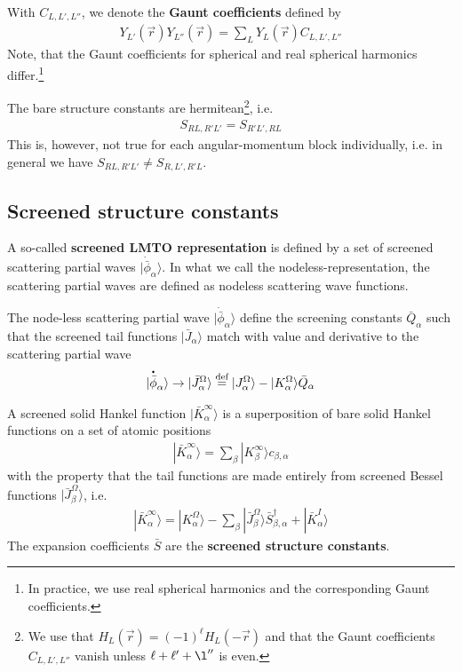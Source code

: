 \documentclass[11pt,a4paper]{report}
\begin{document}
With $C_{L,L',L''}$, we denote the \textbf{Gaunt
  coefficients} defined by
\begin{eqnarray}
Y_{L'}(\vec{r})Y_{L''}(\vec{r})=\sum_L Y_{L}(\vec{r})C_{L,L',L''}
\end{eqnarray}
Note, that the Gaunt coefficients for spherical and real spherical
harmonics differ.\footnote{In practice, we use real spherical
  harmonics and the corresponding Gaunt coefficients.}

The bare structure constants are hermitean\footnote{We use that
  $H_L(\vec{r})=(-1)^\ell H_L(-\vec{r})$ and that the Gaunt
  coefficients $C_{L,L',L''}$ vanish unless $\ell+\ell'+\l''$ is
  even.}, i.e.
\begin{eqnarray}
S_{RL,R'L'}=S_{R'L',RL}
\end{eqnarray}
This is, however, not true for each angular-momentum block individually,
i.e. in general we have $S_{RL,R'L'}\neq S_{R,L',R'L}$.

\subsection{Screened structure constants}
A so-called \textbf{screened LMTO representation} is defined by a set of screened scattering partial waves
$|\dot{\bar{\phi}}_\alpha\rangle$.  In what we call the
nodeless-representation, the scattering partial waves are defined as
nodeless scattering wave functions.

The node-less scattering partial wave
$|\dot{\bar{\phi}}_\alpha\rangle$ define the screening constants
$\bar{Q}_{\alpha}$ such that the screened tail functions
$|\bar{J}_\alpha\rangle$ match with value and derivative to the
scattering partial wave
\begin{eqnarray}
|\overset{\mbox{\large\bfseries .}}{\bar{\phi}}_\alpha\rangle \rightarrow 
|\bar{J}^{\Omega}_{\alpha}\rangle
\stackrel{\text{def}}{=}
|J^{\Omega}_{\alpha}\rangle
-|K^{\Omega}_{\alpha}\rangle \bar{Q}_{\alpha}
\end{eqnarray}

A screened solid Hankel function $|\bar{K}_{\alpha}^\infty\rangle$ is
a superposition of bare solid Hankel functions on a set of atomic
positions
\begin{eqnarray}
|\bar{K}^\infty_\alpha\rangle=\sum_\beta|K^\infty_\beta\rangle c_{\beta,\alpha}
\label{eq:kbarassuperposofkbare}
\end{eqnarray}
with the property that the tail functions are made entirely
from screened Bessel functions $|\bar{J}^\Omega_{\beta}\rangle$, i.e.
\begin{eqnarray}
|\bar{K}_{\alpha}^\infty\rangle=|K^\Omega_{\alpha}\rangle
-\sum_{\beta}|\bar{J}^\Omega_{\beta}\rangle \bar{S}^\dagger_{\beta,\alpha}
+|\bar{K}^I_{\alpha}\rangle
\label{eq:kbarwithsbar}
\end{eqnarray}
The expansion coefficients $\bar{S}$ are the \textbf{screened structure
constants}.
\end{document}

